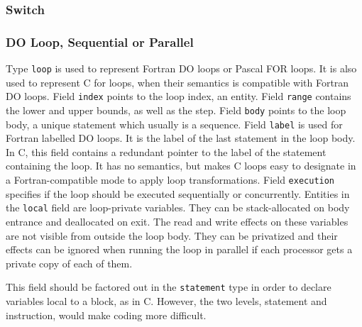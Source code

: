 \documentclass[a4paper]{article}
\begin{document}
\subsubsection{Switch}
\label{subsubsection-switch}



\subsubsection{DO Loop, Sequential or Parallel}
\label{subsubsection-loop}


Type \texttt{loop} is used to represent Fortran DO loops or Pascal FOR
loops. It is also used to represent C for loops, when their semantics
is compatible with Fortran DO loops. Field \texttt{index} points to
the loop index, an entity. Field \texttt{range} contains the lower and
upper bounds, as well as the step. Field \texttt{body} points to the
loop body, a unique statement which usually is a sequence. Field
\texttt{label} is used for Fortran labelled DO loops. It is the label
of the last statement in the loop body. In C, this field contains a
redundant pointer to the label of the statement containing the
loop. It has no semantics, but makes C loops easy to designate in a
Fortran-compatible mode to apply loop transformations. Field
\texttt{execution} specifies if the loop should be executed
sequentially or concurrently. Entities in the
\texttt{local} field are loop-private variables. They
can be stack-allocated on body entrance and deallocated on exit. The
read and write effects on these variables are not visible from outside
the loop body. They can be privatized and their effects can be ignored
when running the loop in parallel if each processor gets a private
copy of each of them.

This field should be factored out in the \verb/statement/ type in order
to declare variables local to a block, as in C. However, the two levels,
statement and instruction, would make coding more difficult.


\begin{comment}
Le domaine \verb/loop/ permet de repr�senter les boucles du type DO Fortran
ou FOR Pascal. Le sous-domaine \verb/index/ contient l'entit� indice de
boucle, le sous-domaine \verb/range/ contient les bornes de la boucle, le
sous-domaine \verb/body/ contient le corps de la boucle, c'est-�-dire un
\verb/statement/, le sous-domaine \verb/label/ contient le label de fin de boucle,
c'est-�-dire une entit�. Le sous-domaine \verb/execution/ d�finit le
comportement dynamique d'une boucle. Les entit�s pr�sentes dans
\verb/locals/ sont propres au corps de boucle (les effets sur elles sont
masqu�s quand on sort de la boucle).
\end{comment}
\end{document}
